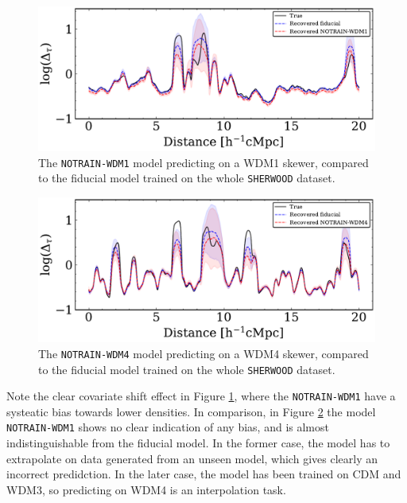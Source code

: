 \begin{figure}
    \centering
    \includegraphics[width=0.9\linewidth]{img/ML/skewer_notrain_wdm1.pdf}
    \caption{The \texttt{NOTRAIN-WDM1} model predicting on a WDM1 skewer, compared to the fiducial model trained on the whole \texttt{SHERWOOD} dataset.}
    \label{fig: skewer notrain wdm1}
\end{figure}

\begin{figure}
    \centering
    \includegraphics[width=0.9\linewidth]{img/ML/skewer_notrain_wdm4.pdf}
    \caption{The \texttt{NOTRAIN-WDM4} model predicting on a WDM4 skewer, compared to the fiducial model trained on the whole \texttt{SHERWOOD} dataset.}
    \label{fig: skewer notrain wdm4}
\end{figure}
Note the clear covariate shift effect in Figure \ref{fig: skewer notrain wdm1}, where the \texttt{NOTRAIN-WDM1} have a systeatic bias towards lower densities. In comparison, in Figure \ref{fig: skewer notrain wdm4} the model \texttt{NOTRAIN-WDM1} shows no clear indication of any bias, and is almost indistinguishable from the fiducial model. In the former case, the model has to extrapolate on data generated from an unseen model, which gives clearly an incorrect predidction. In the later case, the model has been trained on CDM and WDM3, so predicting on WDM4 is an interpolation task.

